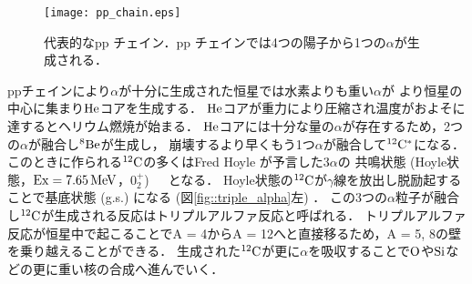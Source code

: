 \documentclass[../master]{subfiles}
\begin{document}
\begin{figure}
  \centering
  \texttt{[image: pp\_chain.eps]}
  \caption{代表的なpp チェイン．pp チェインでは4つの陽子から1つの$\alpha$が生成される．}
  \label{fig::pp_chain}
\end{figure}

ppチェインにより$\alpha$が十分に生成された恒星では水素よりも重い$\alpha$が
より恒星の中心に集まり${\rm He}$コアを生成する．
${\rm He}$コアが重力により圧縮され温度がおよそに達するとヘリウム燃焼が始まる．
${\rm He}$コアには十分な量の$\alpha$が存在するため，2つの$\alpha$が融合し${}^{8}{\rm Be}$が生成し，
崩壊するより早くもう1つ$\alpha$が融合して${}^{12}{\rm C}^{*}$になる．
このときに作られる${}^{12}{\rm C}$の多くはFred Hoyle が予言した$3\alpha$の
共鳴状態 (Hoyle状態，${\rm Ex} = \SIU{7.65}{\mega\electronvolt}$，$0_{2}^{+}$)~\cite{hoyle_state}　となる．
Hoyle状態の${}^{12}{\rm C}$が$\gamma$線を放出し脱励起することで基底状態 (g.s.) になる (図\ref{fig::triple_alpha}左) ．
この3つの$\alpha$粒子が融合し${}^{12}{\rm C}$が生成される反応はトリプルアルファ反応と呼ばれる．
トリプルアルファ反応が恒星中で起こることでA = 4からA = 12へと直接移るため，A = 5, 8の壁を乗り越えることができる．
生成された${}^{12}{\rm C}$が更に$\alpha$を吸収することで${\rm O}$や${\rm Si}$などの更に重い核の合成へ進んでいく．
\end{document}
